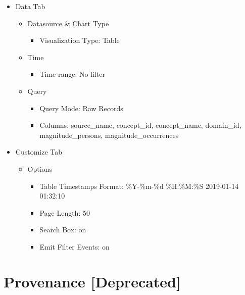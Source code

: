 \documentclass[
]{book}
\providecommand{\tightlist}{%
  \setlength{\itemsep}{0pt}\setlength{\parskip}{0pt}}
\begin{document}
\begin{itemize}
\tightlist
\item
  Data Tab

  \begin{itemize}
  \tightlist
  \item
    Datasource \& Chart Type

    \begin{itemize}
    \tightlist
    \item
      Visualization Type: Table
    \end{itemize}
  \item
    Time

    \begin{itemize}
    \tightlist
    \item
      Time range: No filter
    \end{itemize}
  \item
    Query

    \begin{itemize}
    \tightlist
    \item
      Query Mode: Raw Records
    \item
      Columns: source\_name, concept\_id, concept\_name, domain\_id, magnitude\_persons, magnitude\_occurrences
    \end{itemize}
  \end{itemize}
\item
  Customize Tab

  \begin{itemize}
  \tightlist
  \item
    Options

    \begin{itemize}
    \tightlist
    \item
      Table Timestamps Format: \%Y-\%m-\%d \%H:\%M:\%S \textbar{} 2019-01-14 01:32:10
    \item
      Page Length: 50
    \item
      Search Box: on
    \item
      Emit Filter Events: on
    \end{itemize}
  \end{itemize}
\end{itemize}

\hypertarget{provenance-deprecated}{%
\section{Provenance {[}Deprecated{]}}\label{provenance-deprecated}}
\end{document}

